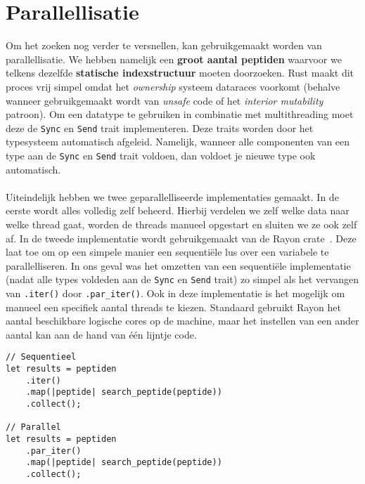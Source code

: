 \section{Parallellisatie}\label{sec:parallellisatie}
Om het zoeken nog verder te versnellen, kan gebruikgemaakt worden van parallellisatie.
We hebben namelijk een \textbf{groot aantal peptiden} waarvoor we telkens dezelfde \textbf{statische indexstructuur} moeten doorzoeken.
Rust maakt dit proces vrij simpel omdat het \textit{ownership} systeem dataraces voorkomt (behalve wanneer gebruikgemaakt wordt van \textit{unsafe} code of het \textit{interior mutability} patroon)\cite{rust_data_races}.
Om een datatype te gebruiken in combinatie met multithreading moet deze de \texttt{Sync} en \texttt{Send} trait implementeren.
Deze traits worden door het typesysteem automatisch afgeleid.
Namelijk, wanneer alle componenten van een type aan de \texttt{Sync} en \texttt{Send} trait voldoen, dan voldoet je nieuwe type ook automatisch.
\\ \\
Uiteindelijk hebben we twee geparallelliseerde implementaties gemaakt.
In de eerste wordt alles volledig zelf beheerd.
Hierbij verdelen we zelf welke data naar welke thread gaat, worden de threads manueel opgestart en sluiten we ze ook zelf af.
In de tweede implementatie wordt gebruikgemaakt van de Rayon crate~\cite{rayon}.
Deze laat toe om op een simpele manier een sequentiële lus over een variabele te parallelliseren.
In ons geval was het omzetten van een sequentiële implementatie (nadat alle types voldeden aan de \texttt{Sync} en \texttt{Send} trait) zo simpel als het vervangen van \texttt{.iter()} door \texttt{.par\_iter()}.
Ook in deze implementatie is het mogelijk om manueel een specifiek aantal threads te kiezen.
Standaard gebruikt Rayon het aantal beschikbare logische cores op de machine, maar het instellen van een ander aantal kan aan de hand van één lijntje code.

\begin{verbatim}
// Sequentieel
let results = peptiden
    .iter()
    .map(|peptide| search_peptide(peptide))
    .collect();

// Parallel
let results = peptiden
    .par_iter()
    .map(|peptide| search_peptide(peptide))
    .collect();
\end{verbatim}

